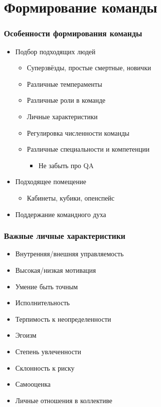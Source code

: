 \documentclass{../../slides-style}
\begin{document}
    \section{Формирование команды}

    \begin{frame}
        \frametitle{Особенности формирования команды}
        \begin{itemize}
            \item Подбор подходящих людей
            \begin{itemize}
                \item Суперзвёзды, простые смертные, новички
                \item Различные темпераменты
                \item Различные роли в команде
                \item Личные характеристики
                \item Регулировка численности команды
                \item Различные специальности и компетенции
                \begin{itemize}
                    \item Не забыть про QA
                \end{itemize}
            \end{itemize}
            \item Подходящее помещение
            \begin{itemize}
                \item Кабинеты, кубики, опенспейс
            \end{itemize}
            \item Поддержание командного духа
        \end{itemize}
    \end{frame}

    \begin{frame}
        \frametitle{Важные личные характеристики}
        \begin{itemize}
            \item Внутренняя/внешняя управляемость
            \item Высокая/низкая мотивация
            \item Умение быть точным
            \item Исполнительность
            \item Терпимость к неопределенности
            \item Эгоизм
            \item Степень увлеченности
            \item Склонность к риску
            \item Самооценка
            \item Личные отношения в коллективе
        \end{itemize}
    \end{frame}
\end{document}

